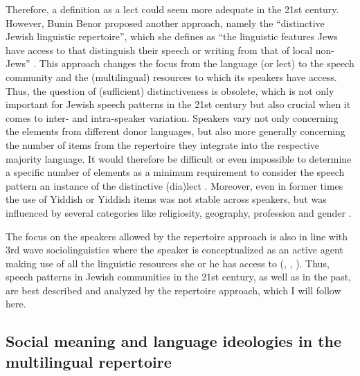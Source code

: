 \documentclass[output=paper]{langscibook}
\begin{document}
Therefore, a definition as a lect could seem more adequate in the 21st century. However, Bunin Benor proposed another approach, namely the “distinctive Jewish linguistic repertoire”, which she defines as “the linguistic features Jews have access to that distinguish their speech or writing from that of local non-Jews” \citep[1064]{BuninBenor2008}. This approach changes the focus from the language (or lect) to the speech community and the (multilingual) resources to which its speakers have access. Thus, the question of (sufficient) distinctiveness is obsolete, which is not only important for Jewish speech patterns in the 21st century but also crucial when it comes to inter- and intra-speaker variation. Speakers vary not only concerning the elements from different donor languages, but also more generally concerning the number of items from the repertoire they integrate into the respective majority language. It would therefore be difficult or even impossible to determine a specific number of elements as a minimum requirement to consider the speech pattern an instance of the distinctive (dia)lect \citep[166--167]{BuninBenor2010}. Moreover, even in former times the use of Yiddish or Yiddish items was not stable across speakers, but was influenced by several categories like religiosity, geography, profession and gender \citep[37--38]{JahnsToAppear}.

The focus on the speakers allowed by the repertoire approach is also in line with 3rd wave sociolinguistics where the speaker is conceptualized as an active agent making use of all the linguistic resources she or he has access to (\citealt{Eckert2012}, \citealt{Irvine2001}, \citealt{JohnstoneEtAl2006}). Thus, speech patterns in Jewish communities in the 21st century, as well as in the past, are best described and analyzed by the repertoire approach, which I will follow here.

\subsection{Social meaning and language ideologies in the multilingual repertoire}
\end{document}
